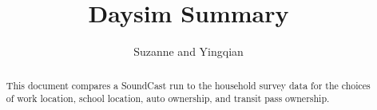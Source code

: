 \documentclass{article}
\begin{document}


\setlength{\textwidth}{4in} 
\def\Sweavesize{\normalsize} 

\title{Daysim Summary}

\author{Suzanne and Yingqian}

\maketitle

\begin{abstract}
This document compares a SoundCast run to the household survey data for the choices of work location, school location, auto ownership, and transit pass ownership.
\end{abstract}
\end{document}
